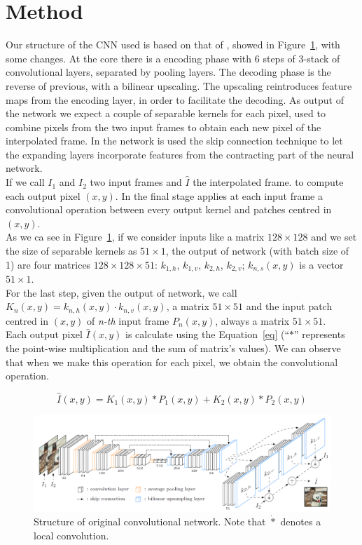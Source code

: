 \documentclass[11pt, a4paper]{article}
\begin{document}
	\section{Method} %
	Our structure of the CNN used is based on that of \cite{mainpaper}, showed in Figure~\ref{original-net}, with some changes. At the core there is a encoding phase with 6 steps of 3-stack of convolutional layers, separated by pooling layers. The decoding phase is the reverse of previous, with a bilinear upscaling. The upscaling reintroduces feature maps from the encoding layer, in order to facilitate the decoding. As output of the network we expect a couple of separable kernels for each pixel, used to combine pixels from the two input frames to obtain each new pixel of the interpolated frame. In the network is used the skip connection technique to let the expanding layers incorporate features from the contracting part of the neural network.\\
	If we call $I_1$ and $I_2$ two input frames and $\hat{I}$ the interpolated frame. to compute each output pixel $(x,y)$. In the final stage applies at each input frame a convolutional operation between every output kernel and patches centred in $(x,y)$.\\
	As we ca see in Figure~\ref{original-net}, if we consider inputs like a matrix $128\times128$ and we set the size of separable kernels as $51\times1$, the output of network (with batch size of 1) are four matrices $128\times128\times51$: $k_{1,h}$, $k_{1,v}$, $k_{2,h}$, $k_{2,v}$; $k_{n,s}(x,y)$ is a vector $51\times1$.\\
	For the last step, given the output of network, we call $K_n(x,y) = k_{n,h}(x,y) \cdot k_{n,v}(x,y)$, a matrix $51\times51$ and the input patch centred in $(x,y)$ of \textit{n-th} input frame $P_n(x,y)$, always a matrix $51\times51$.\\
	Each output pixel $\hat{I}(x,y)$ is calculate using the Equation~\ref{eq} (``$*$'' represents the point-wise multiplication and the sum of matrix's values). We can observe that when we make this operation for each pixel, we obtain the convolutional operation. 
	
	\begin{equation}
		\hat{I}(x,y) = K_1(x,y) * P_1(x,y) + K_2(x,y) * P_2(x,y)
		\label{eq}
	\end{equation}
	
	\begin{figure}
		\centering
		\includegraphics[width=0.6\textheight]{net_structure}
		\caption{Structure of original convolutional network. Note that $\dot{*}$ denotes a local convolution.}
		\label{original-net}
	\end{figure}
\end{document}
